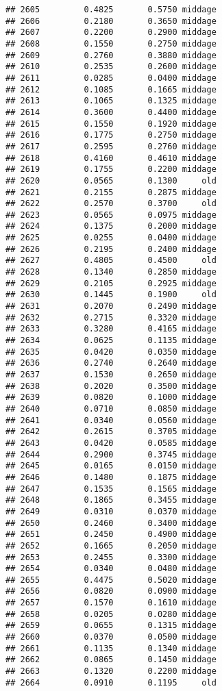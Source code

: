 \documentclass[
]{article}
\begin{document}
\begin{verbatim}
## 2605         0.4825       0.5750 middage
## 2606         0.2180       0.3650 middage
## 2607         0.2200       0.2900 middage
## 2608         0.1550       0.2750 middage
## 2609         0.2760       0.3880 middage
## 2610         0.2535       0.2600 middage
## 2611         0.0285       0.0400 middage
## 2612         0.1085       0.1665 middage
## 2613         0.1065       0.1325 middage
## 2614         0.3600       0.4400 middage
## 2615         0.1550       0.1920 middage
## 2616         0.1775       0.2750 middage
## 2617         0.2595       0.2760 middage
## 2618         0.4160       0.4610 middage
## 2619         0.1755       0.2200 middage
## 2620         0.0565       0.1300     old
## 2621         0.2155       0.2875 middage
## 2622         0.2570       0.3700     old
## 2623         0.0565       0.0975 middage
## 2624         0.1375       0.2000 middage
## 2625         0.0255       0.0400 middage
## 2626         0.2195       0.2400 middage
## 2627         0.4805       0.4500     old
## 2628         0.1340       0.2850 middage
## 2629         0.2105       0.2925 middage
## 2630         0.1445       0.1900     old
## 2631         0.2070       0.2490 middage
## 2632         0.2715       0.3320 middage
## 2633         0.3280       0.4165 middage
## 2634         0.0625       0.1135 middage
## 2635         0.0420       0.0350 middage
## 2636         0.2740       0.2640 middage
## 2637         0.1530       0.2650 middage
## 2638         0.2020       0.3500 middage
## 2639         0.0820       0.1000 middage
## 2640         0.0710       0.0850 middage
## 2641         0.0340       0.0560 middage
## 2642         0.2615       0.3705 middage
## 2643         0.0420       0.0585 middage
## 2644         0.2900       0.3745 middage
## 2645         0.0165       0.0150 middage
## 2646         0.1480       0.1875 middage
## 2647         0.1535       0.1565 middage
## 2648         0.1865       0.3455 middage
## 2649         0.0310       0.0370 middage
## 2650         0.2460       0.3400 middage
## 2651         0.2450       0.4900 middage
## 2652         0.1665       0.2050 middage
## 2653         0.2455       0.3300 middage
## 2654         0.0340       0.0480 middage
## 2655         0.4475       0.5020 middage
## 2656         0.0820       0.0900 middage
## 2657         0.1570       0.1610 middage
## 2658         0.0205       0.0280 middage
## 2659         0.0655       0.1315 middage
## 2660         0.0370       0.0500 middage
## 2661         0.1135       0.1340 middage
## 2662         0.0865       0.1450 middage
## 2663         0.1320       0.2200 middage
## 2664         0.0910       0.1195     old

\end{verbatim}
\end{document}
